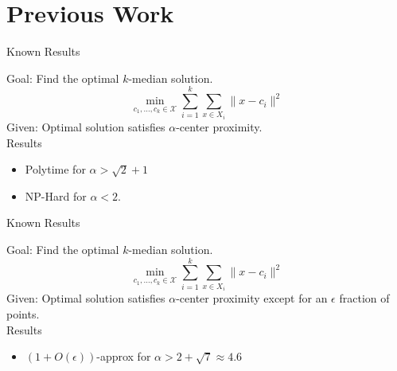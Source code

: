 \documentclass{beamer}
\newcommand{\mc}{\mathcal}
\begin{document}
\section{Previous Work}

\begin{frame}{Known Results}
  
  Goal: Find the optimal $k$-median solution. $$\min_{c_1, \ldots, c_k \in \mc X} \sum_{i=1}^k \sum_{x \in X_i} \|x - c_i\|^2$$ 
  Given: Optimal solution satisfies $\alpha$-center proximity.\\
  \pause
  \vspace{0.2in}Results 
  \begin{itemize}
    \item Polytime for $\alpha > \sqrt{2}+1$ %
    \item NP-Hard for $\alpha < 2$.  
  \end{itemize}
\end{frame}

\begin{frame}{Known Results}
  
  Goal: Find the optimal $k$-median solution. $$\min_{c_1, \ldots, c_k \in \mc X} \sum_{i=1}^k \sum_{x \in X_i} \|x - c_i\|^2$$ 
  Given: Optimal solution satisfies $\alpha$-center proximity except for an $\epsilon$ fraction of points.\\
  \pause
  \vspace{0.2in}Results 
  \begin{itemize}
    \item $(1+O(\epsilon))$-approx for $\alpha > 2+\sqrt{7} \approx 4.6$
  \end{itemize}
\end{frame}


\end{document}
